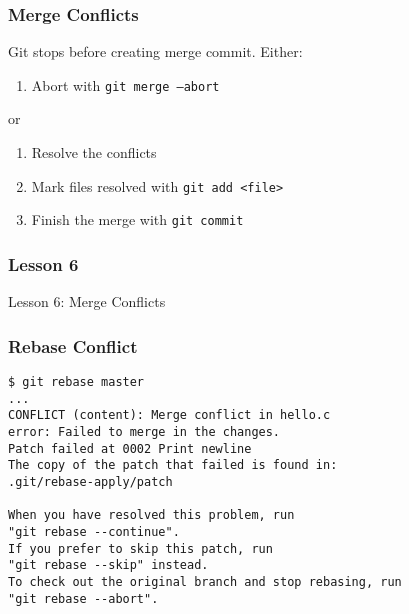 \begin{frame}
    \frametitle{Merge Conflicts}
    Git stops before creating merge commit. Either:
    \medskip
    \begin{enumerate}[1.]
        \item Abort with \texttt{git merge --abort}
    \end{enumerate}
    \medskip
    or
    \medskip
    \begin{enumerate}[1.]
        \item Resolve the conflicts
        \item Mark files resolved with \texttt{git add <file>}
        \item Finish the merge with \texttt{git commit}
    \end{enumerate}
\end{frame}

\begin{frame}
    \frametitle{Lesson 6}
    \alert{Lesson 6}: Merge Conflicts
\end{frame}

\begin{frame}[fragile]
    \frametitle{Rebase Conflict}
    \small
    \begin{verbatim}
$ git rebase master
...
CONFLICT (content): Merge conflict in hello.c
error: Failed to merge in the changes.
Patch failed at 0002 Print newline
The copy of the patch that failed is found in:
.git/rebase-apply/patch

When you have resolved this problem, run
"git rebase --continue".
If you prefer to skip this patch, run
"git rebase --skip" instead.
To check out the original branch and stop rebasing, run
"git rebase --abort".
    \end{verbatim}
\end{frame}

